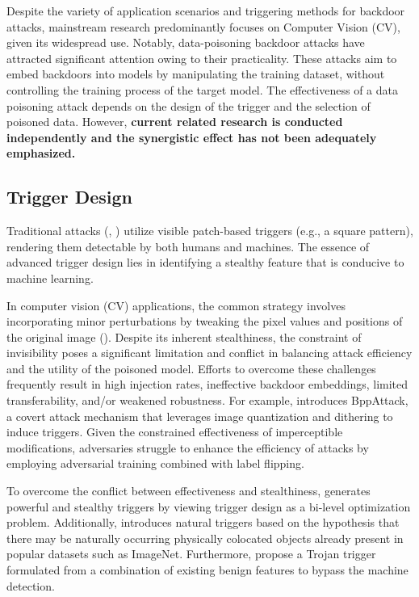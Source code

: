 \documentclass{article}
\begin{document}
Despite the variety of application scenarios and triggering methods for backdoor attacks, mainstream research predominantly focuses on Computer Vision (CV), given its widespread use. Notably, data-poisoning backdoor attacks have attracted significant attention owing to their practicality. These attacks aim to embed backdoors into models by manipulating the training dataset, without controlling the training process of the target model. The effectiveness of a data poisoning attack depends on the design of the trigger and the selection of poisoned data. However, \textbf{current related research is conducted independently and the synergistic effect has not been adequately emphasized.}
\subsection{Trigger Design}
Traditional attacks (\citet{gu2017badnets}, \citet{chen2017targeted}) utilize visible patch-based triggers (e.g., a square pattern), rendering them detectable by both humans and machines. The essence of advanced trigger design lies in identifying a stealthy feature that is conducive to machine learning. 

In computer vision (CV) applications, the common strategy involves incorporating minor perturbations by tweaking the pixel values and positions of the original image (\citet{bai2022hardly}). Despite its inherent stealthiness, the constraint of invisibility poses a significant limitation and conflict in balancing attack efficiency and the utility of the poisoned model. Efforts to overcome these challenges frequently result in high injection rates, ineffective backdoor embeddings, limited transferability, and/or weakened robustness. For example, \citet{wang2022bppattack} introduces BppAttack, a covert attack mechanism that leverages image quantization and dithering to induce triggers. Given the constrained effectiveness of imperceptible modifications, adversaries struggle to enhance the efficiency of attacks by employing adversarial training combined with label flipping. 

To overcome the conflict between effectiveness and stealthiness, \citet{gao2024backdoor} generates powerful and stealthy triggers by viewing trigger design as a bi-level optimization problem. Additionally, \citet{wenger2022finding} introduces natural triggers based on the hypothesis that there may be naturally occurring physically colocated objects already present in popular datasets such as ImageNet. Furthermore, \citet{lin2020composite} propose a Trojan trigger formulated from a combination of existing benign features to bypass the machine detection.
\end{document}
